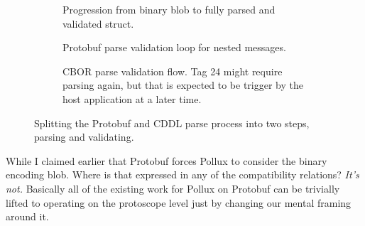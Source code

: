 \begin{figure}[H]
  \centering
  \begin{subfigure}[b]{\textwidth}
    \centering
    \caption{Progression from binary blob to fully parsed and validated struct.}
  \end{subfigure}

  \begin{subfigure}[b]{0.4\textwidth}
    \centering
    \caption{Protobuf parse validation loop for nested messages.}
  \end{subfigure}
  \hspace{1cm}
  \begin{subfigure}[b]{0.4\textwidth}
    \centering
    \caption{CBOR parse validation flow. Tag 24 might require parsing again, but
    that is expected to be trigger by the host application at a later time.}
  \end{subfigure}

  \caption{Splitting the Protobuf and CDDL parse process into two steps, parsing
    and validating.}
  \label{fig:parse-validate}
\end{figure}

While I claimed earlier that Protobuf forces Pollux to consider the binary
encoding blob. Where is that expressed in any of the compatibility relations?
\emph{It's not.} Basically all of the existing work for Pollux on Protobuf can
be trivially lifted to operating on the protoscope level just by changing our
mental framing around it.

